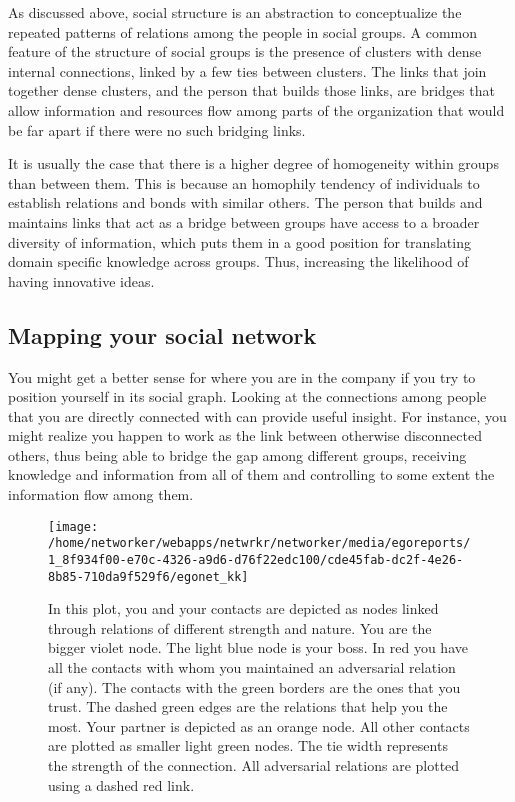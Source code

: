 \documentclass[a4paper,12pt]{article}
\begin{document}
As discussed above, social structure is an abstraction to conceptualize the repeated patterns of relations among the people in social groups. A common feature of the structure of social groups is the presence of clusters with dense internal connections, linked by a few ties between clusters. The links that join together dense clusters, and the person that builds those links, are bridges that allow information and resources flow among parts of the organization that would be far apart if there were no such bridging links.

It is usually the case that there is a higher degree of homogeneity within groups than between them. This is because an homophily tendency of individuals to establish relations and bonds with similar others. The person that builds and maintains links that act as a bridge between groups have access to a broader diversity of information, which puts them in a good position for translating domain specific knowledge across groups. Thus, increasing the likelihood of having innovative ideas.


\newpage


\subsection*{Mapping your social network}


You might get a better sense for where you are in the company if you try to position yourself in its social graph. Looking at the connections among people that you are directly connected with can provide useful insight. For instance, you might realize you happen to work as the link between otherwise disconnected others, thus being able to bridge the gap among different groups, receiving knowledge and information from all of them and controlling to some extent the information flow among them.


\begin{figure}[H]
\centering
\texttt{[image: /home/networker/webapps/netwrkr/networker/media/egoreports/1\_8f934f00-e70c-4326-a9d6-d76f22edc100/cde45fab-dc2f-4e26-8b85-710da9f529f6/egonet\_kk]}
\caption{In this plot, you and your contacts are depicted as nodes linked through relations of different strength and nature. You are the bigger violet node. The light blue node is your boss. In red you have all the contacts with whom you maintained an adversarial relation (if any). The contacts with the green borders are the ones that you trust. The dashed green edges are the relations that help you the most. Your partner is depicted as an orange node. All other contacts are plotted as smaller light green nodes. The tie width represents the strength of the connection. All adversarial relations are plotted using a dashed red link.}
\end{figure}
\end{document}
